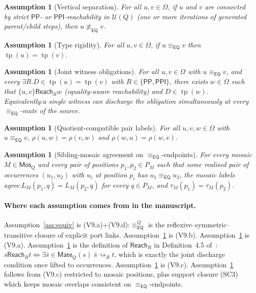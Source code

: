 \documentclass[11pt]{article}
\newtheorem{assumption}[theorem]{Assumption}
\newcommand{\EQ}{\mathsf{EQ}}
\newcommand{\PP}{\mathsf{PP}}
\newcommand{\PPI}{\mathsf{PPI}}
\newcommand{\eqrel}{\equiv_{\EQ}}
\newcommand{\eqQ}{\equiv_{\EQ}^{Q}}
\newcommand{\Mate}{\mathsf{Mate}}
\newcommand{\Mos}{\mathsf{Mos}}
\newcommand{\reach}{\rightsquigarrow}
\newcommand{\Reach}{\mathrel{\mathsf{Reach}}}
\newcommand{\tp}{\operatorname{tp}}
\begin{document}
\begin{assumption}[Vertical separation]\label{ass:vert}
For all \(u, v \in \Omega\), if \(u\) and \(v\) are connected by
strict \(\PP\)- or \(\PPI\)-reachability in \(\mathcal U(Q)\) (one or
more iterations of generated parent/child steps), then
\(u \not\eqrel v\).
\end{assumption}

\begin{assumption}[Type rigidity]\label{ass:type}
For all \(u, v \in \Omega\), if \(u \eqrel v\) then
\(\tp(u) = \tp(v)\).
\end{assumption}

\begin{assumption}[Joint witness obligations]\label{ass:witness}
For all \(u, v \in \Omega\) with \(u \eqrel v\), and every
\(\exists R.D \in \tp(u) = \tp(v)\) with \(R \in \{\PP,\PPI\}\),
there exists \(w \in \Omega\) such that
\(\{u, v\} \Reach_R w\) (equality-aware reachability) and
\(D \in \tp(w)\).  Equivalently:\@ a single witness can discharge the
obligation simultaneously at every \(\eqrel\)-mate of the source.
\end{assumption}

\begin{assumption}[Quotient-compatible pair labels]\label{ass:label}
For all \(u, v, w \in \Omega\) with \(u \eqrel v\),
\(\rho(u, w) = \rho(v, w)\) and \(\rho(w, u) = \rho(w, v)\).
\end{assumption}

\begin{assumption}[Sibling-mosaic agreement on \(\eqrel\)-endpoints]\label{ass:sibling}
For every mosaic \(M \in \Mos_Q\) and every pair of positions
\(p_1, p_2 \in P_M\) such that some realised pair of occurrences
\((u_1, u_2)\) with \(u_i\) at position \(p_i\) has \(u_1 \eqrel u_2\),
the mosaic labels agree:\@ \(L_M(p_1, q) = L_M(p_2, q)\) for every
\(q \in P_M\), and \(\tau_M(p_1) = \tau_M(p_2)\).
\end{assumption}

\paragraph{Where each assumption comes from in the manuscript.}
Assumption~\ref{ass:equiv} is (V9.a)+(V9.d):\@ \(\eqQ\) is the
reflexive--symmetric--transitive closure of explicit port links.
Assumption~\ref{ass:vert} is (V9.b).
Assumption~\ref{ass:type} is (V9.a).
Assumption~\ref{ass:witness} is the definition of \(\Reach_R\) in
Definition~4.5 of~\cite{repaired}:\@
\(s\Reach_R t \iff \exists\widehat s \in \Mate_Q(s)\; \widehat s
\reach_R t\), which is exactly the joint discharge condition once
lifted to occurrences.
Assumption~\ref{ass:label} is (V9.c).
Assumption~\ref{ass:sibling} follows from (V9.c) restricted to
mosaic positions, plus support closure (SC3) which keeps mosaic
overlaps consistent on \(\eqrel\)-endpoints.
\end{document}
